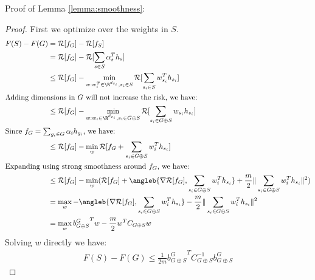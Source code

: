 Proof of Lemma \ref{lemma:smoothness}:
\begin{proof}
First we optimize over the weights in $S$. 
  \begin{align*}
    F(S) - F(G) &= \mathcal{R}[f_G] - \mathcal{R}[f_S]  \\
     &= \mathcal{R}[f_G] - \mathcal{R}[\sum _{s \in S} \alpha_s^T h_s] \\
    &\leq \mathcal{R}[f_G] - \min _{w : w_i^T \in \R^{d_{s_i}}, s_i \in S} 
        \mathcal{R}[ \sum _{s_i \in S} w_{s_i}^T h_{s_i}] \\
\intertext{Adding dimensions in $G$ will not increase the risk, we have: }
    &\leq \mathcal{R}[f_G] - \min _{w : w_i \in \R^{d_{s_i}}, s_i \in G \oplus S}
        \mathcal{R}[ \sum _{s_i \in G \oplus S} w_{s_i} h_{s_i}] \\
\intertext{Since $f_G = \sum _{g_i \in G} \alpha_i h_{g_i}$, we have:}
    &\leq \mathcal{R}[f_G] - \min _{w} 
      \mathcal{R}[f_G + \sum _{s_i \in G \oplus S} w_i^T h_{s_i}] \\
\intertext{Expanding using strong smoothness around $f_G$, we have:}
    &\leq \mathcal{R}[f_G] - \min _{w} (
      \mathcal{R}[f_G] + \angleb{ \nabla \mathcal{R}[f_G], 
        \sum _{s_i \in G\oplus S} w_i^T h_{s_i} } 
        + \frac{m}{2} \Vert \sum _{s_i \in G \oplus S} w_i^T h_{s_i} \Vert ^2) \\
    &= \max_{w} - 
      \angleb{ \nabla \mathcal{R}[f_G], 
      \sum _{s_i \in G\oplus S} w_i^T h_{s_i} } 
        - \frac{m}{2} \Vert \sum _{s_i \in G \oplus S} w_i^T h_{s_i} \Vert ^2 \\
    &= \max_w { b^{G}_{G\oplus S} }^T w - \frac{m}{2} w^T C_{G\oplus S} w
 \end{align*}
Solving $w$ directly we have:
\begin{align*}
  F(S) - F(G) \leq \frac{1}{2m} { b^{G}_{G\oplus S} }^T C_{G\oplus S}^{-1} b^{G}_{G\oplus S}
\end{align*}
\end{proof}

